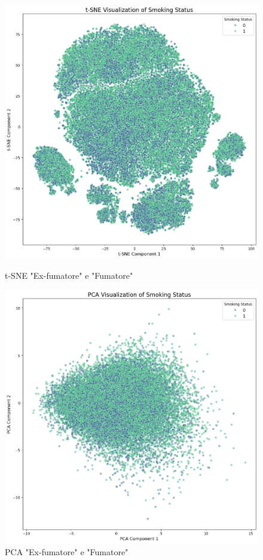 \begin{figure}[h]
    \centering
    \begin{minipage}{0.45\textwidth}
        \centering
        \includegraphics[width=\textwidth]{screen_results/tSNE_smoking_ex_smoking.png}
        \caption{t-SNE "Ex-fumatore" e "Fumatore"}
    \end{minipage}
    \hfill
    \begin{minipage}{0.45\textwidth}
        \centering
        \includegraphics[width=\textwidth]{screen_results/pca_smoking_ex_smoking.png}
        \caption{PCA "Ex-fumatore" e "Fumatore"}
    \end{minipage}
\end{figure}